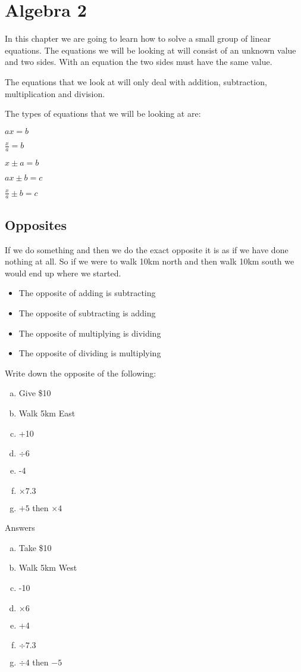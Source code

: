 \chapter{Algebra 2}
In this chapter we are going to learn how to solve a small group of linear equations.  The equations we will be looking at will consist of an unknown value and two sides.  With an equation the two sides must have the same value.

The equations that we look at will only deal with addition, subtraction, multiplication and division.

The types of equations that we will be looking at are:

\begin{multicols}{5}
$ax=b$

$\displaystyle \frac{x}{a}=b$

$x \pm a = b$

$ax \pm b = c$

$\displaystyle \frac{x}{a} \pm b = c$
\end{multicols}

\section{Opposites}
If we do something and then we do the exact opposite it is as if we have done nothing at all.  So if we were to walk 10km north and then walk 10km south we would end up where we started.

\begin{itemize}
	\item The opposite of adding is subtracting
	\item The opposite of subtracting is adding
	\item The opposite of multiplying is dividing
	\item The opposite of dividing is multiplying
\end{itemize}

\begin{exmp}
	Write down the opposite of the following:
	\begin{enumerate}[a)]
		\item Give \$10
		\item Walk 5km East
		\item +10
		\item $\div 6$
		\item -4
		\item $\times 7.3$
		\item $+5$ then $\times 4$
	\end{enumerate}
\bigskip

\noindent Answers

\begin{enumerate}[a)]
	\item Take \$10
	\item Walk 5km West
	\item -10
	\item $\times 6$
	\item +4
	\item $\div 7.3$
	\item $\div 4$ then $-5$
\end{enumerate}
\end{exmp}
